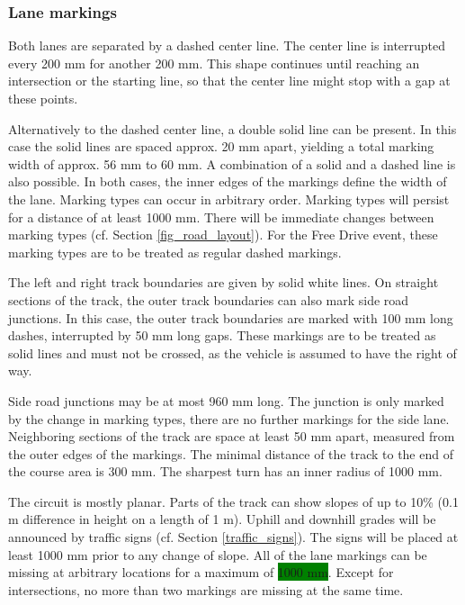 \documentclass[a4paper]{report}
\begin{document}
\subsubsection{Lane markings}
\label{lane_markings}

Both lanes are separated by a dashed center line. The center line is interrupted every 200 mm for another 200 mm. This shape continues until reaching an intersection or the starting line, so that the center line might stop with a gap at these points. 

Alternatively to the dashed center line, a double solid line can be present. In this case the solid lines are spaced approx. 20 mm apart, yielding a total marking width of approx. 56 mm to 60 mm. A combination of a solid and a dashed line is also possible. In both cases, the inner edges of the markings define the width of the lane. Marking types can occur in arbitrary order. Marking types will persist for a distance of at least 1000 mm. There will be immediate changes between marking types (cf. Section \ref{fig_road_layout}). For the Free Drive event, these marking types are to be treated as regular dashed markings. 

The left and right track boundaries are given by solid white lines. On straight sections of the track, the outer track boundaries can also mark side road junctions. In this case, the outer track boundaries are marked with 100 mm long dashes, interrupted by 50 mm long gaps. These markings are to be treated as solid lines and must not be crossed, as the vehicle is assumed to have the right of way. 

Side road junctions may be at most 960 mm long. The junction is only marked by the change in marking types, there are no further markings for the side lane. Neighboring sections of the track are space at least 50 mm apart, measured from the outer edges of the markings. The minimal distance of the track to the end of the course area is 300 mm. The sharpest turn has an inner radius of 1000 mm. 

The circuit is mostly planar. Parts of the track can show slopes of up to 10\% (0.1 m difference in height on a length of 1 m). Uphill and downhill grades will be announced by traffic signs (cf. Section \ref{traffic_signs}). The signs will be placed at least 1000 mm prior to any change of slope. All of the lane markings can be missing at arbitrary locations for a maximum of \colorbox{green}{1000 mm}. Except for intersections, no more than two markings are missing at the same time. 
\end{document}
